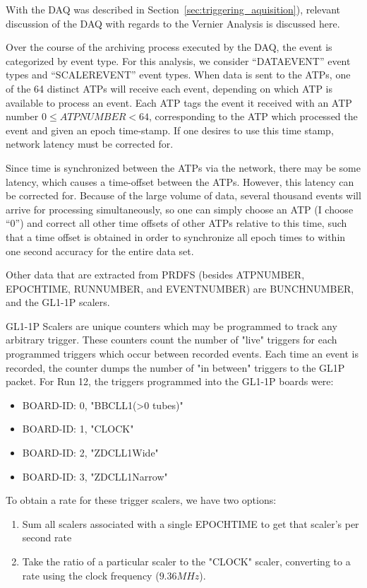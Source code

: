 With the DAQ was described in Section~\ref{sec:triggering_aquisition}),
relevant discussion of the DAQ with regards to the Vernier Analysis is discussed
here.

Over the course of the archiving process executed by the DAQ, the event is
categorized by event type.  For this analysis, we consider ``DATAEVENT'' event
types and ``SCALEREVENT'' event types. When data is sent to the ATPs, one of the
64 distinct ATPs will receive each event, depending on which ATP is available to
process an event. Each ATP tags the event it received with an ATP number $0 \leq
ATPNUMBER < 64$, corresponding to the ATP which processed the event and given an
epoch time-stamp. If one desires to use this time stamp, network latency must be
corrected for.

Since time is synchronized between the ATPs via the network, there may be some
latency, which causes a time-offset between the ATPs. However, this latency can
be corrected for.  Because of the large volume of data, several thousand events
will arrive for processing simultaneously, so one can simply choose an ATP (I
choose ``0'') and correct all other time offsets of other ATPs relative to this
time, such that a time offset is obtained in order to synchronize all epoch
times to within one second accuracy for the entire data set.

Other data that are extracted from PRDFS (besides ATPNUMBER, EPOCHTIME,
RUNNUMBER, and EVENTNUMBER) are BUNCHNUMBER, and the GL1-1P scalers.

GL1-1P Scalers are unique counters which may be programmed to track any
arbitrary trigger. These counters count the number of "live" triggers for each
programmed triggers which occur between recorded events. Each time an event is
recorded, the counter dumps the number of "in between" triggers to the GL1P
packet. For Run 12, the triggers programmed into the GL1-1P boards were:

\begin{itemize}
\item BOARD-ID: 0, "BBCLL1(\textgreater0 tubes)"
\item BOARD-ID: 1, "CLOCK"
\item BOARD-ID: 2, "ZDCLL1Wide"
\item BOARD-ID: 3, "ZDCLL1Narrow"
\end{itemize}

To obtain a rate for these trigger scalers, we have two options:
\begin{enumerate}
\item Sum all scalers associated with a single EPOCHTIME to get that scaler's
  per second rate
\item Take the ratio of a particular scaler to the "CLOCK" scaler, converting
  to a rate using the clock frequency ($9.36MHz$).
\end{enumerate}

